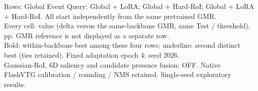 \documentclass{article}
\begin{document}
Rows: Global Event Query; Global + LoRA; Global + Hard-RoI; Global + LoRA + Hard-RoI. All start independently from the same pretrained GMR.\\Every cell: value (delta versus the same-backbone GMR, same Test / threshold), pp. GMR reference is not displayed as a separate row.\\Bold: within-backbone best among these four rows; underline: second distinct best (ties retained). Fixed adaptation epoch 4; seed 2026.\\Gaussian-RoI, 6D saliency and candidate presence fusion: OFF. Native FlashVTG calibration / rounding / NMS retained. Single-seed exploratory results.
\end{document}
